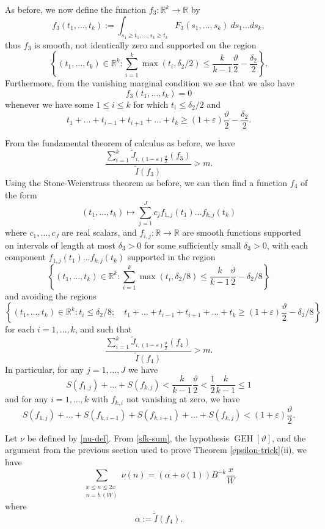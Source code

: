 \documentclass{bmcart}
\DeclareMathOperator*\GEH{GEH}
\theoremstyle{plain}
\theoremstyle{definition}
\newcommand\R{\mathbb{R}}
\newcommand\eps{\varepsilon}
\begin{document}
As before, we now define the function $f_3: \R^k \to \R$ by
$$ f_3(t_1,\dots,t_k) := \int_{s_1 \geq t_1, \dots, s_k \geq t_k} F_3(s_1,\dots,s_k)\ ds_1 \dots ds_k,$$
thus $f_3$ is smooth, not identically zero and supported on the region
$$ \left\{ (t_1,\dots,t_k) \in \R^k: \sum_{i=1}^k \max(t_i, \delta_2/2) \leq \frac{k}{k-1} \frac{\vartheta}{2} - \frac{\delta_2}{2} \right\}.$$
Furthermore, from the vanishing marginal condition we see that we also have
$$ f_3(t_1,\dots,t_k) =0 $$
whenever we have some $1 \leq i \leq k$ for which $t_i \leq \delta_2/2$ and
$$ t_1 + \dots + t_{i-1} + t_{i+1} + \dots + t_k \geq (1+\eps) \frac{\vartheta}{2} - \frac{\delta_2}{2}.$$

From the fundamental theorem of calculus as before, we have
$$
\frac{\sum_{i=1}^k \tilde J_{i,(1-\eps) \frac{\vartheta}{2}}(f_3)}{\tilde I(f_3)} > m.
$$
Using the Stone-Weierstrass theorem as before, we can then find a function $f_4$ of the form
\begin{equation}\label{cff-again}
 (t_1,\dots,t_k) \mapsto \sum_{j=1}^J c_j f_{1,j}(t_1) \dots f_{k,j}(t_k)
\end{equation}
where $c_1,\dots,c_J$ are real scalars, and $f_{i,j}: \R \to \R$ are smooth functions supported on intervals of length at most $\delta_3>0$ for some sufficiently small $\delta_3>0$, with each component
$f_{1,j}(t_1) \dots f_{k,j}(t_k)$ supported in the region
$$ \left\{ (t_1,\dots,t_k) \in \R^k: \sum_{i=1}^k \max(t_i, \delta_2/8) \leq \frac{k}{k-1} \frac{\vartheta}{2} - \delta_2/8 \right\}$$
and avoiding the regions
$$ \left\{ (t_1,\dots,t_k) \in \R^k: t_i \leq \delta_2/8; \quad  t_1 + \dots + t_{i-1} + t_{i+1} + \dots + t_k \geq (1+\eps) \frac{\vartheta}{2} - \delta_2/8 \right\}$$
for each $i=1,\dots,k$, and such that
$$
\frac{\sum_{i=1}^k \tilde J_{i,(1-\eps) \frac{\vartheta}{2}}(f_4)}{\tilde I(f_4)} > m.
$$
In particular, for any $j=1,\dots,J$ we have
\begin{equation}\label{sfk-sum}
S(f_{1,j}) + \dots + S(f_{k,j}) < \frac{k}{k-1} \frac{\vartheta}{2} < \frac{1}{2} \frac{k}{k-1} \leq 1
\end{equation}
and for any $i=1,\dots,k$ with $f_{k,i}$ not vanishing at zero, we have
\begin{equation}\label{sfk-sum-2} 
S(f_{1,j}) + \dots + S(f_{k,i-1}) + S(f_{k,i+1}) + \dots + S(f_{k,j}) < (1+\eps) \frac{\vartheta}{2}.
\end{equation}

Let $\nu$ be defined by \eqref{nu-def}.
From \eqref{sfk-sum}, the hypothesis $\GEH[\vartheta]$, and the argument from the previous section used to prove Theorem \ref{epsilon-trick}(ii), we have
$$ \sum_{\substack{x \leq n \leq 2x\\ n = b\ (W)}} \nu(n) = (\alpha + o(1)) B^{-k} \frac{x}{W}$$
where 
$$ \alpha := \tilde I(f_4).$$
\end{document}
